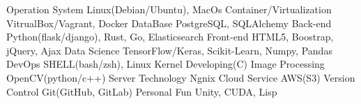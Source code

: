 \begin{cvhonors}
  	\cvhonor
    	{Operation System}
	{Linux(Debian/Ubuntu), MacOs}
    	{}
    	{}
	\cvhonor
	{Container/Virtualization}
	{VitrualBox/Vagrant, Docker}
	{}
	{}
	\cvhonor
    	{DataBase}
    	{PostgreSQL, SQLAlchemy}
    	{}
	{}
  	\cvhonor
    	{Back-end}
	{Python(flask/django), Rust, Go, Elasticsearch}
    	{}
    	{}
	\cvhonor
	{Front-end}
	{HTML5, Boostrap, jQuery, Ajax}
	{}
	{}
  	\cvhonor
    	{Data Science}
	{TensorFlow/Keras, Scikit-Learn, Numpy, Pandas}
    	{}
    	{}
	\cvhonor
	{DevOps}
	{SHELL(bash/zsh), Linux Kernel Developing(C)}
	{}
	{}
	\cvhonor
	{Image Processing}
	{OpenCV(python/c++)}
	{}
	{}
	\cvhonor
	{Server Technology}
	{Ngnix}
	{}
	{}
	\cvhonor
	{Cloud Service}
	{AWS(S3)}
	{}
	{}
	\cvhonor
	{Version Control}
	{Git(GitHub, GitLab)}
	{}
	{}
	\cvhonor
	{Personal Fun}
	{Unity, CUDA, Lisp}
	{}
	{}
\end{cvhonors}
